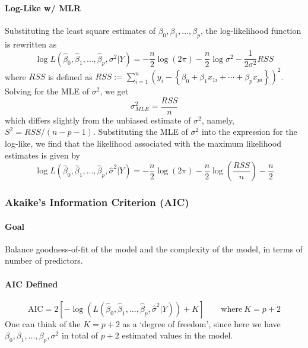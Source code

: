 \documentclass[10pt]{article}
\begin{document}
\paragraph{Log-Like w/ MLR} Substituting the least square estimates of $\beta_{0}, \beta_{1}, \ldots, \beta_{p}$, the log-likelihood function is rewritten as
\begin{equation*}
    \log L\left(\hat{\beta}_{0}, \hat{\beta}_{1}, \ldots, \hat{\beta}_{p}, \sigma^{2} | Y\right)= 
    -\frac{n}{2} \log (2 \pi)-\frac{n}{2} \log \sigma^{2}-\frac{1}{2 \sigma^{2}} R S S
\end{equation*}
where $RSS$ is defined as $RSS:= \sum_{i=1}^{n}\left(y_{i}-\left\{\beta_{0}+\beta_{1} x_{1 i}+\cdots+\beta_{p} x_{p i}\right\}\right)^{2}$. Solving for the MLE of $\sigma^2$, we get
\begin{equation*}
    \sigma_{M L E}^{2}=\frac{R S S}{n}
\end{equation*}
which differs slightly from the unbiased estimate of $\sigma^2$, namely, $S^{2}=R S S /(n-p-1)$. Substituting the MLE of $\sigma^2$ into the expression for the log-like, we find that the likelihood associated with the maximum likelihood estimates is given by
\begin{equation*}
    \log L\left(\hat{\beta}_{0}, \hat{\beta}_{1}, \ldots, \hat{\beta}_{p}, \hat{\sigma}^{2} | Y\right)=-\frac{n}{2} \log (2 \pi)-\frac{n}{2} \log \left(\frac{R S S}{n}\right)-\frac{n}{2}
\end{equation*}



\subsubsection{Akaike’s Information Criterion (AIC)}
\paragraph{Goal} Balance goodness-of-fit of the model and the complexity of the model, in terms of number of predictors. 
\paragraph{AIC Defined}
\begin{equation*}
    \mathrm{AIC}=2\left[-\log \left(L\left(\hat{\beta}_{0}, \hat{\beta}_{1}, \ldots, \hat{\beta}_{p}, \hat{\sigma}^{2} | Y\right)\right)+K\right] \quad \quad \text{where} ~ K = p + 2
\end{equation*}
One can think of the $K = p + 2$ as a `degree of freedom', since here we have $\beta_{0}, \beta_{1}, \ldots, \beta_{p}, \sigma^{2}$ in total of $p + 2$ estimated values in the model.
\end{document}
